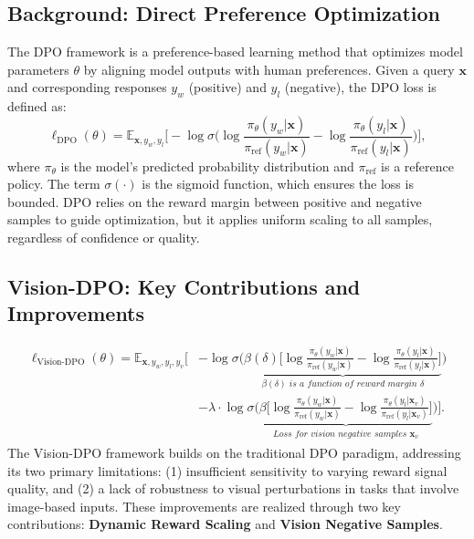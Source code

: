 \subsection{Background: Direct Preference Optimization}
The DPO framework is a preference-based learning method that optimizes model parameters $\theta$ by aligning model outputs with human preferences. Given a query $\mathbf{x}$ and corresponding responses $y_w$ (positive) and $y_l$ (negative), the DPO loss is defined as:
\begin{equation}
\ell_{\text{DPO}}(\theta) = 
\mathbb{E}_{\mathbf{x}, y_w, y_l} 
\Big[ 
    - \log \sigma \Big( 
        \log \frac{\pi_\theta(y_w | \mathbf{x})}{\pi_{\text{ref}}(y_w | \mathbf{x})} 
        - 
        \log \frac{\pi_\theta(y_l | \mathbf{x})}{\pi_{\text{ref}}(y_l | \mathbf{x})}
    \Big)
\Big],
\end{equation}
where $\pi_\theta$ is the model's predicted probability distribution and $\pi_{\text{ref}}$ is a reference policy. The term $\sigma(\cdot)$ is the sigmoid function, which ensures the loss is bounded. DPO relies on the reward margin between positive and negative samples to guide optimization, but it applies uniform scaling to all samples, regardless of confidence or quality.

\subsection{Vision-DPO: Key Contributions and Improvements}

\begin{align}
\ell_{\text{Vision-DPO}}(\theta) = 
\mathbb{E}_{\mathbf{x}, y_w, y_l, y_v} 
\Bigg[ 
    & - \log \sigma \Big( 
        \underbrace{\beta(\delta) \Big[ 
            \log \frac{\pi_\theta(y_w | \mathbf{x})}{\pi_{\text{ref}}(y_w | \mathbf{x})} 
            - 
            \log \frac{\pi_\theta(y_l | \mathbf{x})}{\pi_{\text{ref}}(y_l | \mathbf{x})}
        \Big]}_{{\beta(\delta) \textit{ is a function of reward margin } \delta}}
    \Big) \nonumber \\ 
    & - \lambda \cdot \log \sigma \Big( 
        \underbrace{\beta \Big[
            \log \frac{\pi_\theta(y_w | \mathbf{x})}{\pi_{\text{ref}}(y_w | \mathbf{x})} 
            - 
            \log \frac{\pi_\theta(y_l | \mathbf{x}_v)}{\pi_{\text{ref}}(y_l | \mathbf{x}_v)}
        \Big]}_{\substack{\textit{Loss for vision negative samples }\mathbf{x}_v}}
    \Big)
\Bigg].
\end{align}
The Vision-DPO framework builds on the traditional DPO paradigm, addressing its two primary limitations: (1) insufficient sensitivity to varying reward signal quality, and (2) a lack of robustness to visual perturbations in tasks that involve image-based inputs. These improvements are realized through two key contributions: \textbf{Dynamic Reward Scaling} and \textbf{Vision Negative Samples}.



